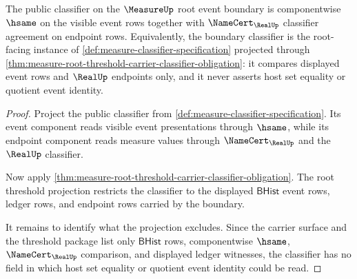 \begin{theorem}
\label{thm:measure-root-event-boundary-classifier}
The public classifier on the $\MeasureUp$ root event boundary is
componentwise $\hsame$ on the visible event rows together with
$\NameCert_{\RealUp}$ classifier agreement on endpoint rows. Equivalently,
the boundary classifier is the root-facing instance of
\autoref{def:measure-classifier-specification} projected through
\autoref{thm:measure-root-threshold-carrier-classifier-obligation}: it
compares displayed event rows and $\RealUp$ endpoints only, and it never
asserts host set equality or quotient event identity.
\end{theorem}
\begin{proof}
Project the public classifier from
\autoref{def:measure-classifier-specification}. Its event component reads
visible event presentations through $\hsame$, while its endpoint component
reads measure values through $\NameCert_{\RealUp}$ and the $\RealUp$
classifier.

Now apply
\autoref{thm:measure-root-threshold-carrier-classifier-obligation}. The
root threshold projection restricts the classifier to the displayed
$\mathsf{BHist}$ event rows, ledger rows, and endpoint rows carried by the
boundary.

It remains to identify what the projection excludes. Since the carrier
surface and the threshold package list only $\mathsf{BHist}$ rows,
componentwise $\hsame$, $\NameCert_{\RealUp}$ comparison, and displayed
ledger witnesses, the classifier has no field in which host set equality or
quotient event identity could be read.
\end{proof}

